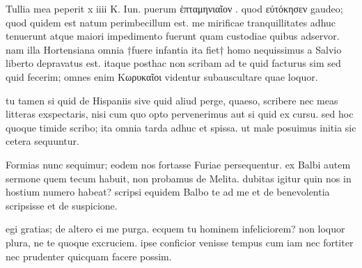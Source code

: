 


 Tullia mea peperit x iiii K. Iun. puerum ἑπταμηνιαῖον . quod εὐτόκησεν gaudeo; quod quidem est natum perimbecillum est. me mirificae tranquillitates adhuc tenuerunt atque maiori impedimento fuerunt quam custodiae quibus adservor. nam illa Hortensiana omnia †fuere infantia ita fiet† homo nequissimus a Salvio liberto depravatus est. itaque posthac non scribam ad te quid facturus sim sed quid fecerim; omnes enim Κωρυκαῖοι videntur subauscultare quae loquor.

 tu tamen si quid de Hispaniis sive quid aliud perge, quaeso, scribere nec meas litteras exspectaris, nisi cum quo opto pervenerimus aut si quid ex cursu. sed hoc quoque timide scribo; ita omnia tarda adhuc et spissa. ut male posuimus initia sic cetera sequuntur.

 Formias nunc sequimur; eodem nos fortasse Furiae persequentur. ex Balbi autem sermone quem tecum habuit, non probamus de Melita. dubitas igitur quin nos in hostium numero habeat? scripsi equidem Balbo te ad me et de benevolentia scripsisse et de suspicione.

 egi gratias; de altero ei me purga. ecquem tu hominem infeliciorem? non loquor plura, ne te quoque excruciem. ipse conficior venisse tempus cum iam nec fortiter nec prudenter quicquam facere possim.
